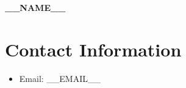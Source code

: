 \documentclass{article}
\begin{document}
\begin{center}
    {\Huge \bfseries __NAME__}
\end{center}

\section*{Contact Information}
\begin{itemize}
    \item Email: __EMAIL__
\end{itemize}
\end{document}

